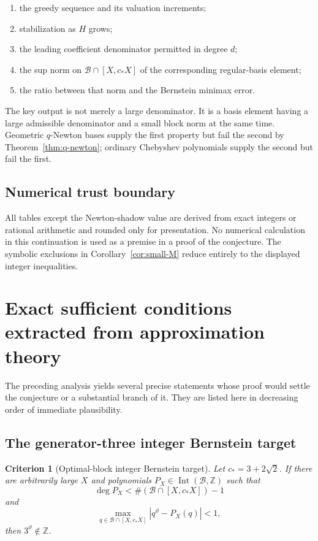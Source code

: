 \documentclass[11pt,oneside]{article}
\newtheorem{criterion}[theorem]{Criterion}
\theoremstyle{definition}
\theoremstyle{remark}
\newcommand{\Z}{\mathbb Z}
\newcommand{\Bsem}{\mathcal B}
\newcommand{\Int}{\operatorname{Int}}
\newcommand{\thetaq}{\vartheta}
\begin{document}
\begin{enumerate}
\item the greedy sequence and its valuation increments;
\item stabilization as $H$ grows;
\item the leading coefficient denominator permitted in degree $d$;
\item the sup norm on $\Bsem\cap[X,c_*X]$ of the corresponding regular-basis element;
\item the ratio between that norm and the Bernstein minimax error.
\end{enumerate}

The key output is not merely a large denominator.  It is a basis element having a large
admissible denominator and a small block norm at the same time.  Geometric $q$-Newton bases
supply the first property but fail the second by
Theorem~\ref{thm:q-newton}; ordinary Chebyshev polynomials supply the second but fail the first.

\subsection{Numerical trust boundary}

All tables except the Newton-shadow value are derived from exact integers or rational
arithmetic and rounded only for presentation.  No numerical calculation in this continuation
is used as a premise in a proof of the conjecture.  The symbolic exclusions in
Corollary~\ref{cor:small-M} reduce entirely to the displayed integer inequalities.


\section{Exact sufficient conditions extracted from approximation theory}
\label{sec:criteria}

The preceding analysis yields several precise statements whose proof would settle the
conjecture or a substantial branch of it.  They are listed here in decreasing order of
immediate plausibility.

\subsection{The generator-three integer Bernstein target}

\begin{criterion}[Optimal-block integer Bernstein target]
\label{crit:M3-bernstein}
Let $c_*=3+2\sqrt2$.  If there are arbitrarily large $X$ and polynomials
$P_X\in\Int(\Bsem,\Z)$ such that
\[
 \deg P_X<\#(\Bsem\cap[X,c_*X])-1
\]
and
\[
 \max_{q\in\Bsem\cap[X,c_*X]}|q^{\thetaq}-P_X(q)|<1,
\]
then $3^{\thetaq}\notin\Z$.
\end{criterion}
\end{document}
